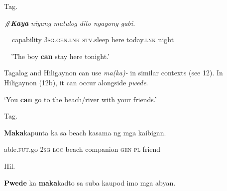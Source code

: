 \begin{listWWNumiileveli}
\item 
\begin{stylelsLanginfo}
Tag.
\end{stylelsLanginfo}
\end{listWWNumiileveli}
\begin{stylelsLanginfo}
\textbf{\textit{\#Kaya}}\textit{ niyang matulog dito ngayong gabi.}
\end{stylelsLanginfo}

\begin{stylelsLanginfo}
\textbf{\ \ }capability 3\textsc{sg.gen.lnk stv}.sleep here today.\textsc{lnk} night
\end{stylelsLanginfo}

\begin{stylelsSourceline}
\textup{\ \ {}'The boy }\textbf{\textup{can}}\textup{ stay here tonight.'}
\end{stylelsSourceline}

\begin{styleStandard}
Tagalog and Hiligaynon can use \textit{ma(ka)-} in similar contexts (see 12). In Hiligaynon (12b), it can occur alongside \textit{pwede}.
\end{styleStandard}

\begin{listWWNumiileveli}
\item 
\begin{stylelsLanginfo}
‘You \textbf{can} go to the beach/river with your friends.’
\end{stylelsLanginfo}

\begin{listWWNumiilevelii}
\item 
\begin{stylelsLanginfo}
Tag.
\end{stylelsLanginfo}
\end{listWWNumiilevelii}
\end{listWWNumiileveli}
\begin{stylelsSourceline}
\textbf{Maka}kapunta ka sa beach kasama ng mga kaibigan\textup{.}
\end{stylelsSourceline}

\begin{stylelsIMT}
able.\textsc{fut}.go 2\textsc{sg} \textsc{loc} beach companion \textsc{gen pl }friend
\end{stylelsIMT}

\begin{listWWNumiileveli}
\item 
\begin{listWWNumiilevelii}
\item 
\begin{stylelsLanginfo}
Hil.
\end{stylelsLanginfo}
\end{listWWNumiilevelii}
\end{listWWNumiileveli}
\begin{stylelsSourceline}
\textbf{Pwede} ka \textbf{maka}kadto sa suba kaupod imo mga abyan.
\end{stylelsSourceline}

